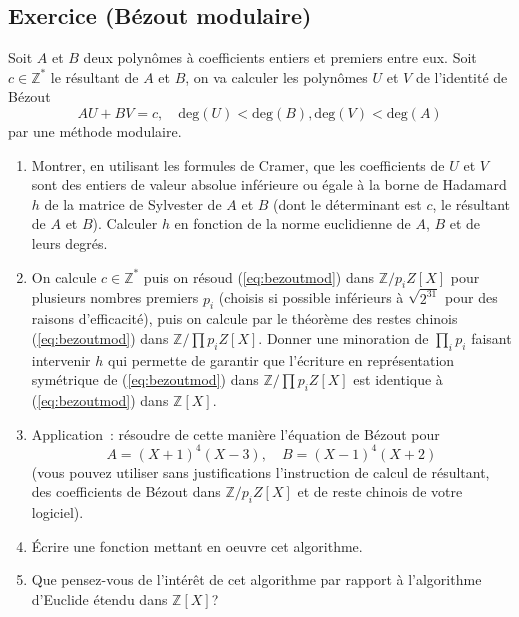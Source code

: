 \documentclass[a4paper,11pt]{article}
\newcommand{\Z}{{\mathbb{Z}}}
\begin{document}
\subsection{Exercice (Bézout modulaire)}
Soit $A$ et $B$ deux polynômes à coefficients entiers et premiers
entre eux. Soit $c \in \Z^* $ le résultant de $A$ et $B$,
on va calculer les polynômes $U$ et $V$ de l'identité de Bézout 
\begin{equation} \label{eq:bezoutmod}
 A U + B V = c , \quad \mbox{deg}(U)<\mbox{deg}(B), \mbox{deg}(V)<\mbox{deg}(A)
\end{equation}
par une méthode modulaire.
\begin{enumerate}
\item Montrer, en utilisant les formules de Cramer,
que les coefficients de $U$ et $V$ sont des entiers de
valeur absolue inférieure ou égale à la borne de Hadamard $h$ de
la matrice de Sylvester de $A$ et $B$ (dont le déterminant est $c$,
le résultant de $A$ et $B$). Calculer $h$ en fonction
de la norme euclidienne de $A$, $B$ et de leurs degr\'es. 
\item On calcule $c \in \Z^*$ puis on
résoud (\ref{eq:bezoutmod}) dans $\Z/p_i Z[X]$ pour
plusieurs nombres premiers $p_i$ (choisis si possible inférieurs 
à $\sqrt{2^{31}}$ pour des raisons d'efficacité), puis on calcule par le
théorème des restes chinois (\ref{eq:bezoutmod}) 
dans $\Z/\prod p_i Z[X]$. Donner une minoration de 
$\prod_i p_i$ faisant intervenir $h$ qui permette de garantir
que l'écriture en représentation symétrique de (\ref{eq:bezoutmod})
dans $\Z/\prod p_i Z[X]$ est identique \`a (\ref{eq:bezoutmod}) dans $\Z[X]$.
\item Application~: résoudre de cette manière l'équation de
Bézout pour 
\[ A=(X+1)^4(X-3), \quad B=(X-1)^4(X+2)\] 
(vous pouvez utiliser
sans justifications l'instruction de calcul de r\'esultant,
des coefficients de Bézout dans $\Z/p_iZ[X]$ et 
de reste chinois de votre logiciel).
\item \'Ecrire une fonction mettant en oeuvre cet algorithme.
\item Que pensez-vous de l'intérêt de cet algorithme par rapport à
l'algorithme d'Euclide étendu dans $\Z[X]$?
\end{enumerate}
\end{document}
